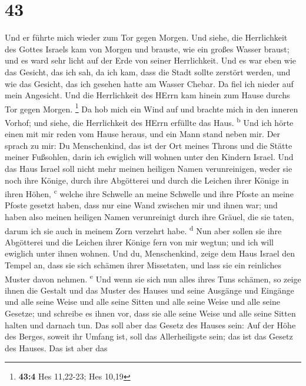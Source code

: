 \hypertarget{section-42}{%
\section{43}\label{section-42}}

 Und er führte mich wieder zum Tor gegen Morgen.
 Und siehe, die Herrlichkeit des Gottes Israels kam von
Morgen und brauste, wie ein großes Wasser braust; und es ward sehr licht
auf der Erde von seiner Herrlichkeit.  Und es war eben wie
das Gesicht, das ich sah, da ich kam, dass die Stadt sollte zerstört
werden, und wie das Gesicht, das ich gesehen hatte am Wasser Chebar. Da
fiel ich nieder auf mein Angesicht.  Und die Herrlichkeit
des HErrn kam hinein zum Hause durchs Tor gegen Morgen. \footnote{\textbf{43:4}
  Hes 11,22-23; Hes 10,19}  Da hob mich ein Wind auf und
brachte mich in den inneren Vorhof; und siehe, die Herrlichkeit des
HErrn erfüllte das Haus. \textsuperscript{b}  Und ich
hörte einen mit mir reden vom Hause heraus, und ein Mann stand neben
mir.  Der sprach zu mir: Du Menschenkind, das ist der Ort
meines Throns und die Stätte meiner Fußsohlen, darin ich ewiglich will
wohnen unter den Kindern Israel. Und das Haus Israel soll nicht mehr
meinen heiligen Namen verunreinigen, weder sie noch ihre Könige, durch
ihre Abgötterei und durch die Leichen ihrer Könige in ihren Höhen,
\textsuperscript{c}  welche ihre Schwelle an meine
Schwelle und ihre Pfoste an meine Pfoste gesetzt haben, dass nur eine
Wand zwischen mir und ihnen war; und haben also meinen heiligen Namen
verunreinigt durch ihre Gräuel, die sie taten, darum ich sie auch in
meinem Zorn verzehrt habe. \textsuperscript{d}  Nun aber
sollen sie ihre Abgötterei und die Leichen ihrer Könige fern von mir
wegtun; und ich will ewiglich unter ihnen wohnen.  Und
du, Menschenkind, zeige dem Haus Israel den Tempel an, dass sie sich
schämen ihrer Missetaten, und lass sie ein reinliches Muster davon
nehmen. \textsuperscript{e}  Und wenn sie sich nun alles
ihres Tuns schämen, so zeige ihnen die Gestalt und das Muster des Hauses
und seine Ausgänge und Eingänge und alle seine Weise und alle seine
Sitten und alle seine Weise und alle seine Gesetze; und schreibe es
ihnen vor, dass sie alle seine Weise und alle seine Sitten halten und
darnach tun.  Das soll aber das Gesetz des Hauses sein:
Auf der Höhe des Berges, soweit ihr Umfang ist, soll das Allerheiligste
sein; das ist das Gesetz des Hauses.  Das ist aber das
